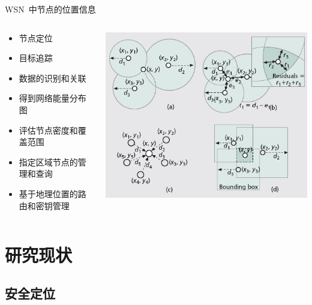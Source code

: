 \documentclass[mathserif,compress,CJKutf8, red]{beamer}
\begin{document}
\begin{CJK*}{UTF8}{song}
\begin{frame}{WSN~中节点的位置信息}
\begin{columns}
  \begin{column}{0.5\textwidth}
\begin{itemize}
\item 节点定位
\item 目标追踪
\item 数据的识别和关联
\item 得到网络能量分布图
\item 评估节点密度和覆盖范围
\item 指定区域节点的管理和查询
\item 基于地理位置的路由和密钥管理
\end{itemize}
  \end{column}
  \begin{column}{0.5\textwidth}
  \includegraphics[width=\textwidth]{images/localization.png}
  \end{column}
\end{columns}
\end{frame}

\section{研究现状}

\subsection{安全定位}


\end{CJK*}
\end{document}

